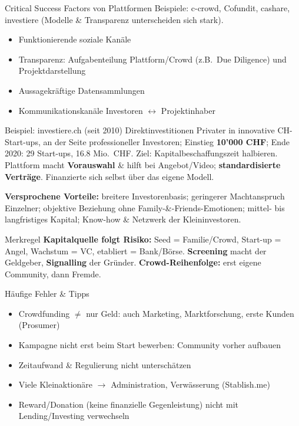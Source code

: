 \documentclass[a4paper, fontsize=7pt]{scrartcl}
\begin{document}
\begin{mainbox}{Critical Success Factors von Plattformen}
Beispiele: c-crowd, Cofundit, cashare, investiere (Modelle \& Transparenz
unterscheiden sich stark).
\begin{itemize}
    \item Funktionierende soziale Kanäle
    \item Transparenz: Aufgabenteilung Plattform/Crowd (z.B.\ Due Diligence)
    und Projektdarstellung
    \item Aussagekräftige Datensammlungen
    \item Kommunikationskanäle Investoren $\leftrightarrow$ Projektinhaber
\end{itemize}
\end{mainbox}

\begin{subbox}{Beispiel: investiere.ch (seit 2010)}
Direktinvestitionen Privater in innovative CH-Start-ups, an der Seite
professioneller Investoren; Einstieg \textbf{10'000 CHF}; Ende 2020: 29
Start-ups, 16.8 Mio.\ CHF. Ziel: Kapitalbeschaffungszeit halbieren. Plattform
macht \textbf{Vorauswahl} \& hilft bei Angebot/Video; \textbf{standardisierte
Verträge}. Finanzierte sich selbst über das eigene Modell.

\textbf{Versprochene Vorteile:} breitere Investorenbasis; geringerer
Machtanspruch Einzelner; objektive Beziehung ohne Family-\&-Friends-Emotionen;
mittel- bis langfristiges Kapital; Know-how \& Netzwerk der Kleininvestoren.
\end{subbox}

\begin{subbox}{Merkregel}
\textbf{Kapitalquelle folgt Risiko:} Seed = Familie/Crowd, Start-up = Angel,
Wachstum = VC, etabliert = Bank/Börse. \textbf{Screening} macht der Geldgeber,
\textbf{Signalling} der Gründer. \textbf{Crowd-Reihenfolge:} erst eigene
Community, dann Fremde.
\end{subbox}

\begin{subbox}{Häufige Fehler \& Tipps}
\begin{itemize}
    \item Crowdfunding $\neq$ nur Geld: auch Marketing, Marktforschung, erste
    Kunden (Prosumer)
    \item Kampagne nicht erst beim Start bewerben: Community vorher aufbauen
    \item Zeitaufwand \& Regulierung nicht unterschätzen
    \item Viele Kleinaktionäre $\to$ Administration, Verwässerung (Stablish.me)
    \item Reward/Donation (keine finanzielle Gegenleistung) nicht mit
    Lending/Investing verwechseln
\end{itemize}
\end{subbox}
\end{document}
